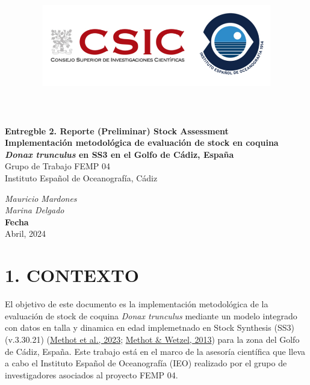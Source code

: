 \documentclass[
]{article}
\title{\includegraphics[width=10cm,height=\textheight]{IEO-logo2.png}}
\author{}
\date{\vspace{-2.5em}}
\begin{document}
\maketitle



\begin{flushleft}
\Large{\textbf{Entregble 2. Reporte (Preliminar) Stock Assessment}}\\
\vspace*{2\baselineskip}
\LARGE{\textbf{Implementación metodológica de evaluación de stock en coquina \textit{Donax trunculus} en SS3 en el Golfo de Cádiz, España}}\\
\vspace*{5\baselineskip}
\Large{Grupo de Trabajo FEMP 04}\\
\vspace*{1\baselineskip}
\Large{Instituto Español de Oceanografía, Cádiz }\\
\vspace*{4\baselineskip}
\end{flushleft}
\begin{flushright}
\large{\textit{Mauricio Mardones}}\\
\large{\textit{Marina Delgado}}\\
\vspace*{1\baselineskip}
\normalsize{\textbf{Fecha}}\\
Abril, 2024
\end{flushright}



\hypersetup{linkcolor = black}
\newpage
{}

\newpage



\hypersetup{linkcolor = blue}

{
\hypersetup{linkcolor=}
\setcounter{tocdepth}{3}
\tableofcontents
}
\pagebreak

\hypertarget{contexto}{%
\section{1. CONTEXTO}\label{contexto}}

El objetivo de este documento es la implementación metodológica de la evaluación de stock de coquina \emph{Donax trunculus} mediante un modelo integrado con datos en talla y dinamica en edad implemetnado en Stock Synthesis (SS3) (v.3.30.21) (\protect\hyperlink{ref-Methot2023}{Methot et al., 2023}; \protect\hyperlink{ref-Methot2013}{Methot \& Wetzel, 2013}) para la zona del Golfo de Cádiz, España. Este trabajo está en el marco de la asesoría científica que lleva a cabo el Instituto Español de Oceanografía (IEO) realizado por el grupo de investigadores asociados al proyecto FEMP 04.
\end{document}
